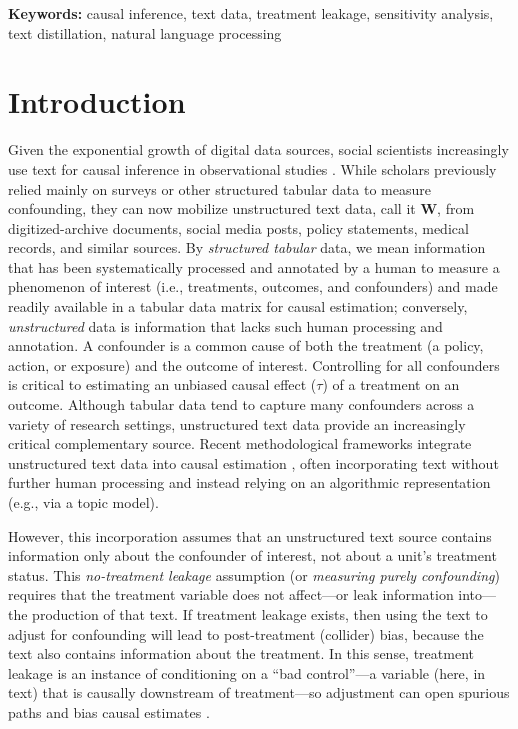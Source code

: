 \documentclass[11pt]{article}
\newcommand{\bW}{\bm{W}}  %
\begin{document}
\noindent\textbf{Keywords:} causal inference, text data, treatment leakage, sensitivity analysis, text distillation, natural language processing

\bigskip

\section{Introduction}\label{s:intro}
Given the exponential growth of digital data sources, social scientists increasingly use text for causal inference in observational studies \citep{roberts2020}. While scholars previously relied mainly on surveys or other structured tabular data to measure confounding, they can now mobilize unstructured text data, call it $\bW$, from digitized-archive documents, social media posts, policy statements, medical records, and similar sources. By \textit{structured tabular} data, we mean information that has been systematically processed and annotated by a human to measure a phenomenon of interest (i.e., treatments, outcomes, and confounders) and made readily available in a tabular data matrix for causal estimation; conversely, \textit{unstructured} data is information that lacks such human processing and annotation. A confounder is a common cause of both the treatment (a policy, action, or exposure) and the outcome of interest. Controlling for all confounders is critical to estimating an unbiased causal effect ($\tau$) of a treatment on an outcome. Although tabular data tend to capture many confounders across a variety of research settings, unstructured text data provide an increasingly critical complementary source. Recent methodological frameworks integrate unstructured text data into causal estimation \citep{mozer2020}, often incorporating text without further human processing and instead relying on an algorithmic representation (e.g., via a topic model).

However, this incorporation assumes that an unstructured text source contains information only about the confounder of interest, not about a unit's treatment status. This \emph{no-treatment leakage} assumption (or \emph{measuring purely confounding}) \citep{daoud2022conceptualizing} requires that the treatment variable does not affect---or leak information into---the production of that text. If treatment leakage exists, then using the text to adjust for confounding will lead to post-treatment (collider) bias, because the text also contains information about the treatment. In this sense, treatment leakage is an instance of conditioning on a ``bad control''---a variable (here, in text) that is causally downstream of treatment---so adjustment can open spurious paths and bias causal estimates \citep{cinelli2024crash}.
\end{document}
